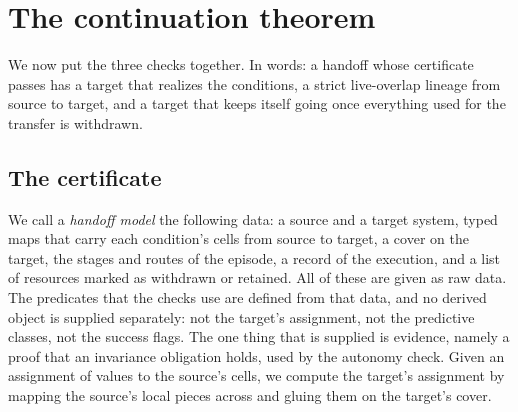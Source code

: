 \section{The continuation theorem}
\label{sec:continuation}

We now put the three checks together. In words: a handoff whose certificate
passes has a target that realizes the conditions, a strict live-overlap
lineage from source to target, and a target that keeps itself going once
everything used for the transfer is withdrawn.

\subsection{The certificate}

We call a \emph{handoff model} the following data: a source and a target system, typed maps
that carry each condition's cells from source to target, a cover on the
target, the stages and routes of the episode, a record of the execution, and a
list of resources marked as withdrawn or retained. All of these are given as
raw data. The predicates that the checks use are defined from that data, and
no derived object is supplied separately: not the target's assignment, not the
predictive classes, not the success flags. The one thing that is supplied is
evidence, namely a proof that an invariance obligation holds, used by the
autonomy check. Given an assignment of values to
the source's cells, we compute the target's assignment by mapping the
source's local pieces across and gluing them on the target's cover.

